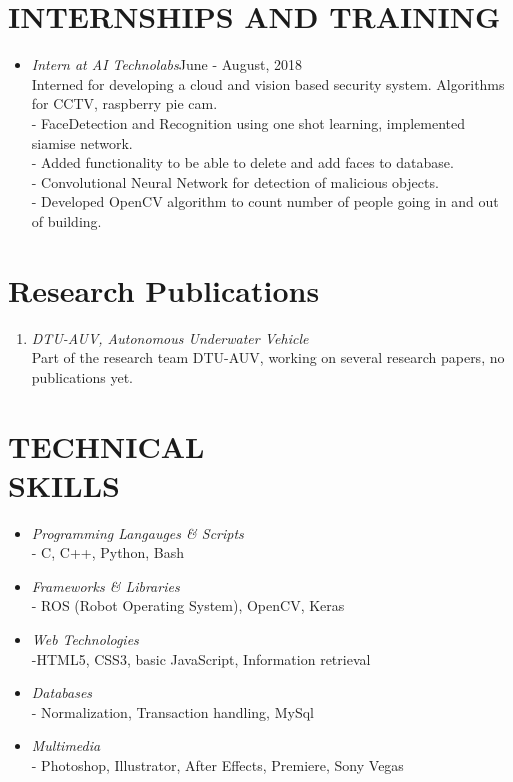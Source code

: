 \documentclass[margin]{res}
\begin{document}
\begin{resume}
\section{INTERNSHIPS AND TRAINING} \begin{itemize}
 \item{\large{\sl Intern at AI Technolabs}}\hfill June - August, 2018 \\
 	Interned for developing a cloud and vision based security system. Algorithms for CCTV, raspberry pie cam.\\
	- FaceDetection and Recognition using one shot learning, implemented siamise network.\\
	- Added functionality to be able to delete and add faces to database.\\
	- Convolutional Neural Network for detection of malicious objects.\\
	- Developed OpenCV algorithm to count number of people going in and out of building.\\
 \end{itemize}

\section{Research Publications}\begin{enumerate}
\item {\sl DTU-AUV, Autonomous Underwater Vehicle  }\\
	Part of the research team DTU-AUV, working on several research papers, no publications yet.

\end{enumerate}

\section{TECHNICAL  \\ SKILLS} \begin{itemize}
\item {\sl Programming Langauges \& Scripts }\\
	- C, C++, Python, Bash
\item {\sl Frameworks \& Libraries}\\
	- ROS (Robot Operating System), OpenCV, Keras
\item {\sl Web Technologies}\\
	 -HTML5, CSS3, basic JavaScript, Information retrieval
 \item{\sl Databases}\\
	- Normalization, Transaction handling, MySql
 \item{\sl Multimedia}\\
	- Photoshop, Illustrator, After Effects, Premiere, Sony Vegas
\end{itemize}


\end{resume}
\end{document}

